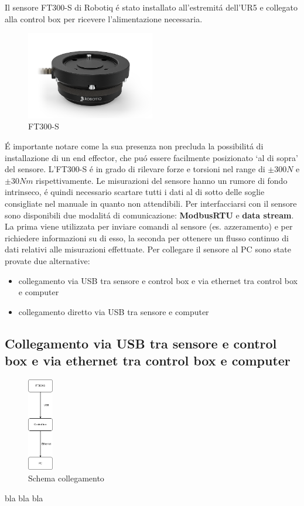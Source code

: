 Il sensore FT300-S di Robotiq \'{e} stato installato all'estremit\'{a} dell'UR5 e collegato alla control box per ricevere 
l'alimentazione necessaria. 
\begin{figure}[H]
    \centering
    \includegraphics*[width=0.5\textwidth]{images/ft.png}
    \caption{FT300-S}
    \label{fig:ft}
\end{figure}
\'{E} importante notare come la sua presenza non precluda la possibilit\'{a} di installazione di un end effector, 
che pu\'{o} essere facilmente posizionato `al di sopra' del sensore. 
L'FT300-S \'{e} in grado di rilevare forze e torsioni nel range di $\pm 300 N$ e $\pm 30 Nm$ rispettivamente. 
Le misurazioni del sensore hanno un rumore di fondo intrinseco, \'{e} quindi necessario scartare tutti i dati al di sotto delle 
soglie consigliate nel manuale \cite{ft_sensor} in quanto non attendibili. 
Per interfacciarsi con il sensore sono disponibili due modalit\'{a} di comunicazione: \textbf{ModbusRTU} e \textbf{data stream}. 
La prima viene utilizzata per inviare comandi al sensore (es. azzeramento) e per richiedere informazioni su di esso, la seconda 
per ottenere un flusso continuo di dati relativi alle misurazioni effettuate. 
Per collegare il sensore al PC sono state provate due alternative: 
\begin{itemize}
    \item collegamento via USB tra sensore e control box e via ethernet tra control box e computer
    \item collegamento diretto via USB tra sensore e computer
\end{itemize}

\subsection{Collegamento via USB tra sensore e control box e via ethernet tra control box e computer}
\begin{figure}[H]
    \centering
    \includegraphics*[width=0.1\textwidth]{images/ft-cbox-pc.png}
    \caption{Schema collegamento}
    \label{fig:ft-cbox-pc}
\end{figure}
bla bla bla

